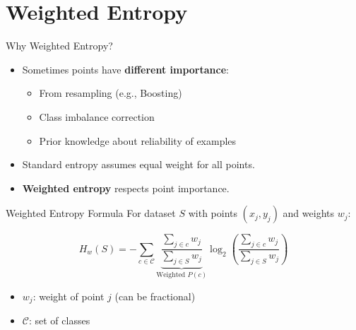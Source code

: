 \documentclass[usenames,dvipsnames]{beamer}
\begin{document}

\section{Weighted Entropy}

\begin{frame}{Why Weighted Entropy?}
\begin{keypointsbox}
\begin{itemize}
\item Sometimes points have \textbf{different importance}:
  \begin{itemize}
    \item From resampling (e.g., Boosting)
    \item Class imbalance correction
    \item Prior knowledge about reliability of examples
  \end{itemize}
\item Standard entropy assumes equal weight for all points.
\item \textbf{Weighted entropy} respects point importance.
\end{itemize}
\end{keypointsbox}
\end{frame}

\begin{frame}{Weighted Entropy Formula}
For dataset $S$ with points $(x_j, y_j)$ and weights $w_j$:

\[
H_w(S) = - \sum_{c \in \mathcal{C}} 
\underbrace{\frac{\sum_{j \in c} w_j}{\sum_{j \in S} w_j}}_{\text{Weighted }P(c)}
\log_2 \left( \frac{\sum_{j \in c} w_j}{\sum_{j \in S} w_j} \right)
\]

\begin{itemize}
\item $w_j$: weight of point $j$ (can be fractional)
\item $\mathcal{C}$: set of classes
\end{itemize}
\end{frame}
\end{document}
